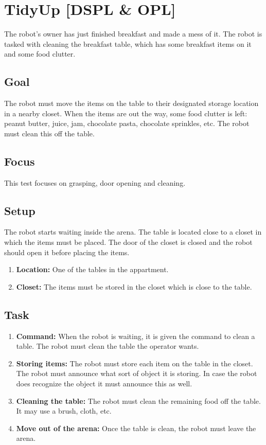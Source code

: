 \section{TidyUp [DSPL \& OPL]}
The robot's owner has just finished breakfast and made a mess of it. 
The robot is tasked with cleaning the breakfast table, which has some breakfast items on it and some food clutter. 

\subsection{Goal}
The robot must move the items on the table to their designated storage location in a nearby closet. 
When the items are out the way, some food clutter is left: peanut butter, juice, jam, chocolate pasta, chocolate sprinkles, etc. 
The robot must clean this off the table. 

\subsection{Focus}
This test focuses on grasping, door opening and cleaning. 

\subsection{Setup}
The robot starts waiting inside the arena. 
The table is located close to a closet in which the items must be placed. 
The door of the closet is closed and the robot should open it before placing the items. 

\begin{enumerate}
\item \textbf{Location:} One of the tables in the appartment.
\item \textbf{Closet:} The items must be stored in the closet which is close to the table. 
\end{enumerate}

\subsection{Task}
\begin{enumerate}
\item \textbf{Command:} When the robot is waiting, it is given the command to clean a table. The robot must clean the table the operator wants.
\item \textbf{Storing items:} The robot must store each item on the table in the closet. 
  The robot must announce what sort of object it is storing. 
  In case the robot does recognize the object it must announce this as well. 
\item \textbf{Cleaning the table:} The robot must clean the remaining food off the table. It may use a brush, cloth, etc. 
\item \textbf{Move out of the arena:} Once the table is clean, the robot must leave the arena. 
\end{enumerate}

